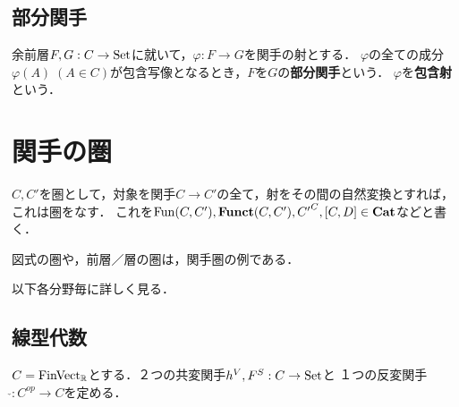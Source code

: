 \documentclass[uplatex, dvipdfmx]{jsreport}
\begin{document}
\subsection{部分関手}

\begin{definition}[subfunctor]
    余前層$F,G:C\to\mathrm{Set}$に就いて，$\varphi:F\to G$を関手の射とする．
    $\varphi$の全ての成分$\varphi(A)\;(A\in C)$が包含写像となるとき，$F$を$G$の\textbf{部分関手}という．
    $\varphi$を\textbf{包含射}という．
\end{definition}

\section{関手の圏}

\begin{definition}
    $C,C'$を圏として，対象を関手$C\rightarrow C'$の全て，射をその間の自然変換とすれば，これは圏をなす．
    これを$\mathrm{Fun}(C,C'),\mathbf{Funct}(C,C'), {C'}^{C}, [C,D]\in \mathbf{Cat}$などと書く．
\end{definition}

\begin{example}
    図式の圏や，前層／層の圏は，関手圏の例である．
\end{example}

以下各分野毎に詳しく見る．

\subsection{線型代数}

$C=\mathrm{FinVect}_{\mathbb{R}}$とする．２つの共変関手$h^V,F^S:C\to\mathrm{Set}$と
１つの反変関手$\check{}:C^{op}\to C$を定める．
\end{document}
